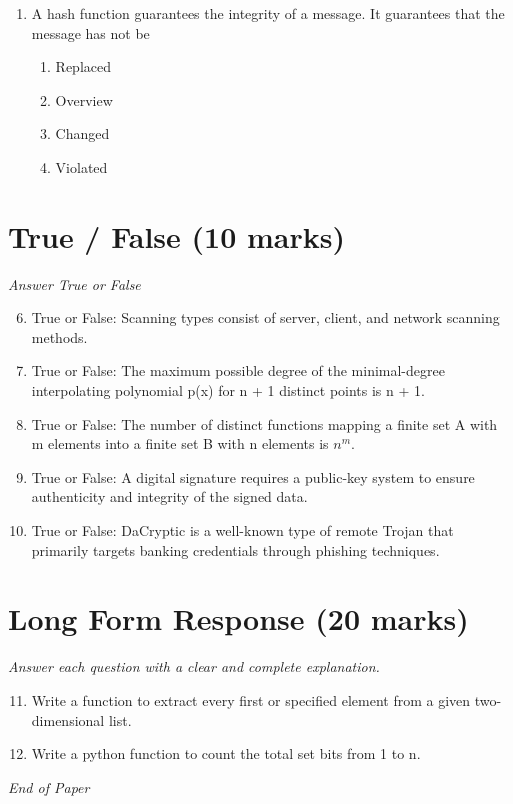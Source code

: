 \documentclass[12pt]{article}
\begin{document}
\begin{enumerate}[label=\arabic*.]
\begin{enumerate}[label=(\alph*)]
    \item Condition codes set by every instruction
    \item Variable-length encoding of instructions
    \item Instructions requiring widely varying numbers of cycles to execute
    \item Several different classes (sets) of registers
\end{enumerate}
\item A hash function guarantees the integrity of a message. It guarantees that the message has not be
\begin{enumerate}[label=(\alph*)]
    \item Replaced
    \item Overview
    \item Changed
    \item Violated
\end{enumerate}
\end{enumerate}

\section*{True / False (10 marks)}
\textit{Answer True or False}
\begin{enumerate}[label=\arabic*.]
\setcounter{enumi}{5}
\item True or False: Scanning types consist of server, client, and network scanning methods.
\item True or False: The maximum possible degree of the minimal-degree interpolating polynomial p(x) for n + 1 distinct points is n + 1.
\item True or False: The number of distinct functions mapping a finite set A with m elements into a finite set B with n elements is $n^m$.
\item True or False: A digital signature requires a public-key system to ensure authenticity and integrity of the signed data.
\item True or False: DaCryptic is a well-known type of remote Trojan that primarily targets banking credentials through phishing techniques.
\end{enumerate}

\section*{Long Form Response (20 marks)}
\textit{Answer each question with a clear and complete explanation.}
\begin{enumerate}[label=\arabic*.]
\setcounter{enumi}{10}
\item Write a function to extract every first or specified element from a given two-dimensional list.
\item Write a python function to count the total set bits from 1 to n.
\end{enumerate}

\vfill
\noindent\textit{End of Paper}
\end{document}
